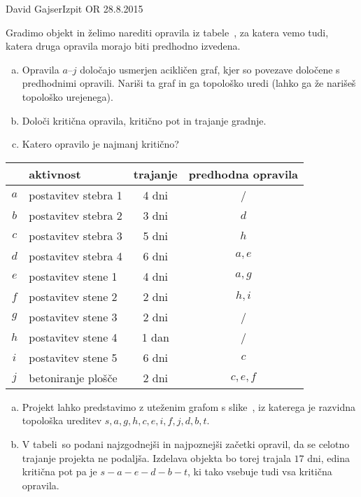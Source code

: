 \begin{naloga}{David Gajser}{Izpit OR 28.8.2015}
\begin{vprasanje}
Gradimo objekt in želimo narediti opravila iz tabele~\tab,
za katera vemo tudi, katera druga opravila morajo biti predhodno izvedena.
\begin{enumerate}[(a)]
\item Opravila $a$--$j$ določajo usmerjen acikličen graf,
kjer so povezave določene s predhodnimi opravili.
Nariši ta graf in ga topološko uredi
(lahko ga že narišeš topološko urejenega).

\item Določi kritična opravila, kritično pot in trajanje gradnje.

\item Katero opravilo je najmanj kritično?
\end{enumerate}

\begin{tabela}
\begin{tabular}{c|l|c|c}
& aktivnost & trajanje & predhodna opravila \\
\hline
$a$ & postavitev stebra 1 & 4 dni & / \\
$b$ & postavitev stebra 2 & 3 dni & $d$ \\
$c$ & postavitev stebra 3 & 5 dni & $h$ \\
$d$ & postavitev stebra 4 & 6 dni & $a, e$ \\
$e$ & postavitev stene 1  & 4 dni & $a, g$ \\
$f$ & postavitev stene 2  & 2 dni & $h, i$ \\
$g$ & postavitev stene 3  & 2 dni & / \\
$h$ & postavitev stene 4  & 1 dan & / \\
$i$ & postavitev stene 5  & 6 dni & $c$ \\
$j$ & betoniranje plošče  & 2 dni & $c, e, f$
\end{tabular}
\end{tabela}
\end{vprasanje}

\begin{odgovor}
\begin{enumerate}[(a)]
\item Projekt lahko predstavimo z uteženim grafom s slike~\fig,
iz katerega je razvidna topološka ureditev
$s, a, g, h, c, e, i, f, j, d, b, t$.

\item V tabeli~ so podani
najzgodnejši in najpoznejši začetki opravil,
da se celotno trajanje projekta ne podaljša.
Izdelava objekta bo torej trajala $17$ dni,
edina kritična pot pa je $s - a - e - d - b - t$,
ki tako vsebuje tudi vsa kritična opravila.


\end{enumerate}
\end{odgovor}
\end{naloga}
